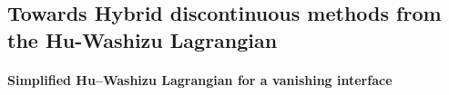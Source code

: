 \subsection{Towards Hybrid discontinuous methods from the Hu-Washizu Lagrangian}


\paragraph{Simplified Hu–Washizu Lagrangian for a vanishing interface}

